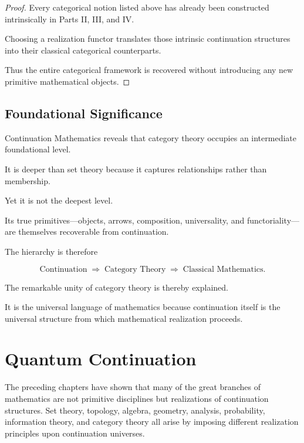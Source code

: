 \documentclass[13pt,openany]{book}
\theoremstyle{plain}
\theoremstyle{definition}
\begin{document}
\begin{proof}
Every categorical notion listed above has already been constructed
intrinsically in Parts II, III, and IV.

Choosing a realization functor translates those intrinsic continuation
structures into their classical categorical counterparts.

Thus the entire categorical framework is recovered without introducing any new
primitive mathematical objects.
\end{proof}

\section{Foundational Significance}

Continuation Mathematics reveals that category theory occupies an intermediate
foundational level.

It is deeper than set theory because it captures relationships rather than
membership.

Yet it is not the deepest level.

Its true primitives—objects, arrows, composition, universality, and
functoriality—are themselves recoverable from continuation.

The hierarchy is therefore

\[
\text{Continuation}
\;\Longrightarrow\;
\text{Category Theory}
\;\Longrightarrow\;
\text{Classical Mathematics}.
\]

The remarkable unity of category theory is thereby explained.

It is the universal language of mathematics because continuation itself is the
universal structure from which mathematical realization proceeds.

\chapter{Quantum Continuation}

The preceding chapters have shown that many of the great branches of
mathematics are not primitive disciplines but realizations of continuation
structures. Set theory, topology, algebra, geometry, analysis, probability,
information theory, and category theory all arise by imposing different
realization principles upon continuation universes.
\end{document}
